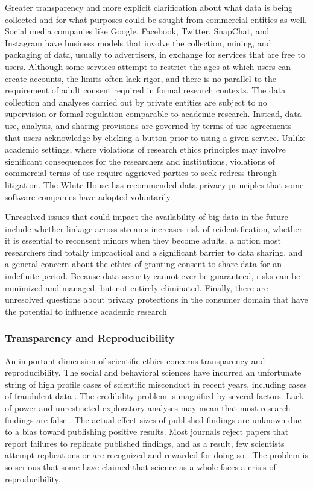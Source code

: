 \documentclass[letterpaper,man,apacite,natbib]{apa6}
\begin{document}
Greater transparency and more explicit clarification about what data is being collected and for what purposes could be sought from commercial entities as well.
Social media companies like Google, Facebook, Twitter, SnapChat, and Instagram have business models that involve the collection, mining, and packaging of data, usually to advertisers, in exchange for services that are free to users.
Although some services attempt to restrict the ages at which users can create accounts, the limits often lack rigor, and there is no parallel to the requirement of adult consent required in formal research contexts.
The data collection and analyses carried out by private entities are subject to no supervision or formal regulation comparable to academic research.
Instead, data use, analysis, and sharing provisions are governed by terms of use agreements that users acknowledge by clicking a button prior to using a given service.
Unlike academic settings, where violations of research ethics principles may involve significant consequences for the researchers and institutions, violations of commercial terms of use require aggrieved parties to seek redress through litigation.
The White House has recommended data privacy principles \cite{data-privacy-networked-world} that some software companies have adopted voluntarily.

Unresolved issues that could impact the availability of big data in the future include whether linkage across streams increases risk of reidentification, whether it is essential to reconsent minors when they become adults, a notion most researchers find totally impractical and a significant barrier to data sharing, and a general concern about the ethics of granting consent to share data for an indefinite period.
Because data security cannot ever be guaranteed, risks can be minimized and managed, but not entirely eliminated. 
Finally, there are unresolved questions about privacy protections in the consumer domain that have the potential to influence academic research

\subsubsection{Transparency and Reproducibility}

An important dimension of scientific ethics concerns transparency and reproducibility.
The social and behavioral sciences have incurred an unfortunate string of high profile cases of scientific misconduct in recent years, including cases of fraudulent data \cite{singal_case_2015, bhattacharjee_diederik_2013}.
The credibility problem is magnified by several factors.
Lack of power and unrestricted exploratory analyses may mean that most research findings are false \cite{ioannidis_why_2005}.
The actual effect sizes of published findings are unknown due to a bias toward publishing positive results.
Most journals reject papers that report failures to replicate published findings, and as a result, few scientists attempt replications or are recognized and rewarded for doing so \cite{nosek_scientific_2012}.
The problem is so serious that some have claimed that science as a whole faces a crisis of reproducibility.
\end{document}
